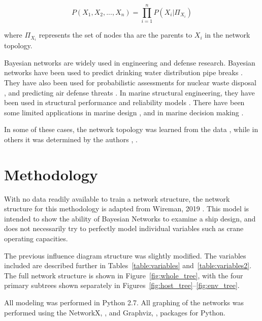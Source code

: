 \documentclass{svproc}
\begin{document}
\begin{equation}
    P(X_1,X_2,...,X_n) = \prod_{i=1}^n P(X_i|\Pi_{X_i})
    \label{eq:conditional_prob}
\end{equation}

\noindent
where $\Pi_{X_i}$ represents the set of nodes tha are the parents to $X_i$ in the network topology. 

Bayesian networks are widely used in engineering and defense research. Bayesian networks have been used to predict drinking water distribution pipe breaks \cite{francis_bayesian_2014}. They have also been used for probabilistic assessments for nuclear waste disposal \cite{lee_application_2006}, and predicting air defense threats \cite{johansson_bayesian_nodate}. In marine structural engineering, they have been used in structural performance and reliability models \cite{groden_fusing_2017}. There have been some limited applications in marine design \cite{friis-hansen_bayesian_2000}, and in marine decision making \cite{eleye-datubo_enabling_2006}. 

In some of these cases, the network topology was learned from the data \cite{francis_bayesian_2014}, while in others it was determined by the authors \cite{johansson_bayesian_nodate}, \cite{groden_fusing_2017}. 

\FloatBarrier 


\section{Methodology}

With no data readily available to train a network structure, the network structure for this methodology is adapted from Wireman, 2019 \cite{wireman_leading_2019}. This model is intended to show the ability of Bayesian Networks to examine a ship design, and does not necessarily try to perfectly model individual variables such as crane operating capacities.  

The previous influence diagram structure was slightly modified. The variables included are described further in Tables~\ref{table:variables} and~\ref{table:variables2}. The full network structure is shown in Figure~\ref{fig:whole_tree}, with the four primary subtrees shown separately in Figures~\ref{fig:host_tree}--\ref{fig:env_tree}. 

All modeling was performed in Python 2.7. All graphing of the networks was performed using the NetworkX, \cite{networkx_2018}, and Graphviz, \cite{graphviz_2018}, packages for Python. 
\end{document}
